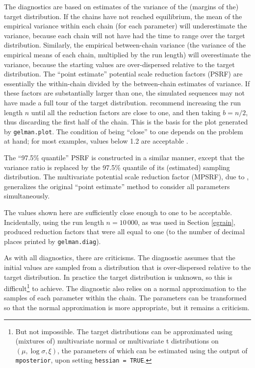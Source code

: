 \documentclass[11pt,a4paper]{article}
\begin{document}
The diagnostics are based on estimates of the variance of the (margins of the) target distribution.
If the chains have not reached equilibrium, the mean of the empirical variance within each chain (for each parameter) will underestimate the variance, because each chain will not have had the time to range over the target distribution.
Similarly, the empirical between-chain variance (the variance of the empirical means of each chain, multiplied by the run length) will overestimate the variance, because the starting values are over-dispersed relative to the target distribution.
The ``point estimate'' potential scale reduction factors (PSRF) are essentially the within-chain divided by the between-chain estimates of variance.
If these factors are substantially larger than one, the simulated sequences may not have made a full tour of the target distribution.
\citet{gelmrubi92} recommend increasing the run length $n$ until all the reduction factors are close to one, and then taking $b=n/2$, thus discarding the first half of the chain.
This is the basis for the plot generated by \verb+gelman.plot+.
The condition of being ``close'' to one depends on the problem at hand; for most examples, values below 1.2 are acceptable \citep{gelmcarl95}.

The ``97.5\% quantile'' PSRF is constructed in a similar manner, except that the variance ratio is replaced by the 97.5\% quantile of its (estimated) sampling distribution.  
The multivariate potential scale reduction factor (MPSRF), due to \citet{broogelm97}, generalizes the original ``point estimate'' method to consider all parameters simultaneously.

The values shown here are sufficiently close enough to one to be acceptable.
Incidentally, using the run length $n=10\,000$, as was used in Section \ref{egrain}, produced reduction factors that were all equal to one (to the number of decimal places printed by \verb+gelman.diag+).

As with all diagnostics, there are criticisms.
The diagnostic assumes that the initial values are sampled from a distribution that is over-dispersed relative to the target distribution.
In practice the target distribution is unknown, so this is difficult\footnote{But not impossible. The target distributions can be approximated using (mixtures of) multivariate normal or multivariate t distributions on $(\mu, \log\sigma, \xi)$, the parameters of which can be estimated using the output of \texttt{mposterior}, upon setting \texttt{hessian = TRUE}.} to achieve.
The diagnostic also relies on a normal approximation to the samples of each parameter within the chain.
The parameters can be transformed so that the normal approximation is more appropriate, but it remains a criticism.
\end{document}
